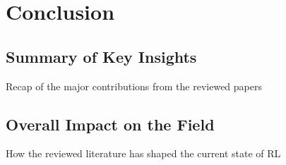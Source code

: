 \documentclass[journal]{IEEEtran}
\begin{document}
\section{Conclusion}
\label{sec:conclusion}

\subsection{Summary of Key Insights}
Recap of the major contributions from the reviewed papers

\subsection{Overall Impact on the Field}
How the reviewed literature has shaped the current state of RL


\label{sec:references}
\printbibliography

\end{document}
